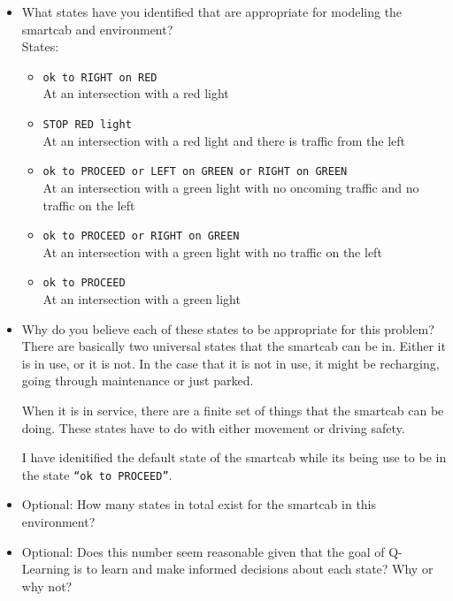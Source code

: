 \documentclass[twoside,openright,titlepage,numbers=noenddot,headinclude,%
               footinclude=true,cleardoublepage=empty,abstractoff,BCOR=5mm,%
               paper=a4,fontsize=11pt,ngerman,american]{scrreprt}
\numberwithin{theorem}{chapter}
\numberwithin{definition}{chapter}
\numberwithin{algorithm}{chapter}
\numberwithin{figure}{chapter}
\numberwithin{table}{chapter}
\numberwithin{equation}{chapter}
\begin{document}
\begin{itemize}
\item What states have you identified that are appropriate for modeling the smartcab and environment?\\
States: 
  \begin{itemize}
    \item \texttt{ok to RIGHT on RED}\\ At an intersection with a red light
    \item \texttt{STOP RED light} \\ At an intersection with a red light and there is traffic from the left
    \item \texttt{ok to PROCEED or LEFT on GREEN or RIGHT on GREEN} \\ At an intersection with a green light with no oncoming traffic and no traffic on the left
    \item \texttt{ok to PROCEED or RIGHT on GREEN} \\At an intersection with a green light with no traffic on the left
    \item \texttt{ok to PROCEED} \\ At an intersection with a green light
   
  \end{itemize}



\item Why do you believe each of these states to be appropriate for this problem?\\

There are basically two universal states that the smartcab can be in. Either it is in use, or it is not. In the case that it is not in use, it might be recharging, going through maintenance or just parked.

When it is in service, there are a finite set of things that the smartcab can be doing. These states have to do with either movement or driving safety.

I have idenitified the default state of the smartcab while its being use to be in the state \texttt{``ok to PROCEED''}. 






\item Optional: How many states in total exist for the smartcab in this environment?
\item Optional: Does this number seem reasonable given that the goal of Q-Learning is to learn and make informed decisions about each state? Why or why not?
\end{itemize}
\end{document}

